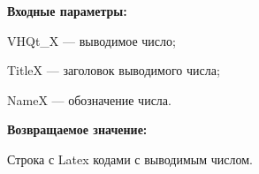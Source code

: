 \textbf{Входные параметры:}
 
VHQt\_X --- выводимое число;
 
TitleX --- заголовок выводимого числа;
 
NameX --- обозначение числа.

\textbf{Возвращаемое значение:}

Строка с Latex кодами с выводимым числом.